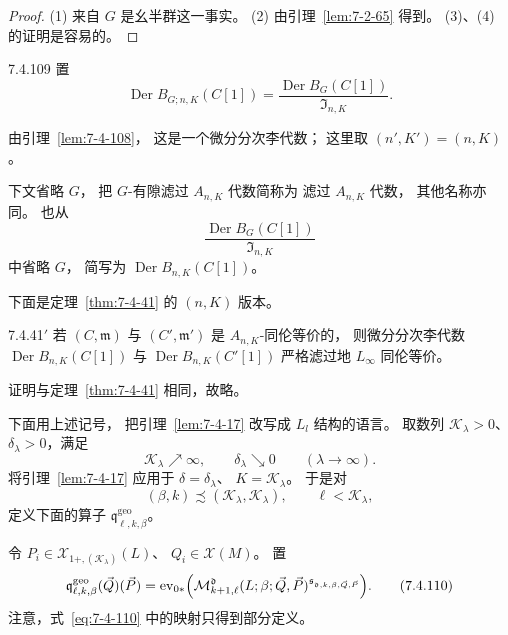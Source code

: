 \begin{proof}
(1) 来自 $G$ 是幺半群这一事实。
(2) 由引理~\ref{lem:7-2-65} 得到。
(3)、(4) 的证明是容易的。
\end{proof}

\begin{definition}{7.4.109}\label{def:7-4-109}
置
\[
\operatorname{Der}B_{G;n,K}(C[1])
=
\frac{\operatorname{Der}B_G(C[1])}
{\mathfrak I_{n,K}}.
\]
\end{definition}
由引理~\ref{lem:7-4-108}，
这是一个微分分次李代数；
这里取 $(n',K')=(n,K)$。

下文省略 $G$，
把 $G$-有隙滤过 $A_{n,K}$ 代数简称为
滤过 $A_{n,K}$ 代数，
其他名称亦同。
也从
\[
\frac{\operatorname{Der}B_G(C[1])}
{\mathfrak I_{n,K}}
\]
中省略 $G$，
简写为 $\operatorname{Der}B_{n,K}(C[1])$。

下面是定理~\ref{thm:7-4-41}
的 $(n,K)$ 版本。

\begin{theorem}{7.4.41$'$}\label{thm:7-4-41-prime}
若 $(C,\mathfrak m)$ 与
$(C',\mathfrak m')$
是 $A_{n,K}$-同伦等价的，
则微分分次李代数
$\operatorname{Der}B_{n,K}(C[1])$
与
$\operatorname{Der}B_{n,K}(C'[1])$
严格滤过地 $L_\infty$ 同伦等价。
\end{theorem}

证明与定理~\ref{thm:7-4-41} 相同，故略。

下面用上述记号，
把引理~\ref{lem:7-4-17}
改写成 $L_l$ 结构的语言。
取数列 $\mathcal K_\lambda>0$、
$\delta_\lambda>0$，满足
\[
\mathcal K_\lambda\nearrow\infty,
\qquad
\delta_\lambda\searrow0
\qquad(\lambda\to\infty).
\]
将引理~\ref{lem:7-4-17}
应用于
$\delta=\delta_\lambda$、
$K=\mathcal K_\lambda$。
于是对
\[
(\beta,k)\precsim
(\mathcal K_\lambda,\mathcal K_\lambda),
\qquad
\ell<\mathcal K_\lambda,
\]
定义下面的算子
$\mathfrak q^{\mathrm{geo}}_{\ell,k,\beta}$。

令
$P_i\in\mathcal X_{1+,(\mathcal K_\lambda)}(L)$、
$Q_i\in\mathcal X(M)$。
置
\begin{equation}
\begin{aligned}
\mathfrak q^{\mathrm{geo}}_{\ell,k,\beta}
(\vec Q)(\vec P)
=\operatorname{ev}_{0*}\Bigl(
\mathcal M^{\mathfrak d}_{k+1,\ell}
(L;\beta;\vec Q,\vec P)^{
\mathfrak s_{\mathfrak d,k,\beta,\vec Q,\vec P}}
\Bigr).
\end{aligned}
\tag{7.4.110}\label{eq:7-4-110}
\end{equation}
注意，式~\eqref{eq:7-4-110}
中的映射只得到部分定义。

